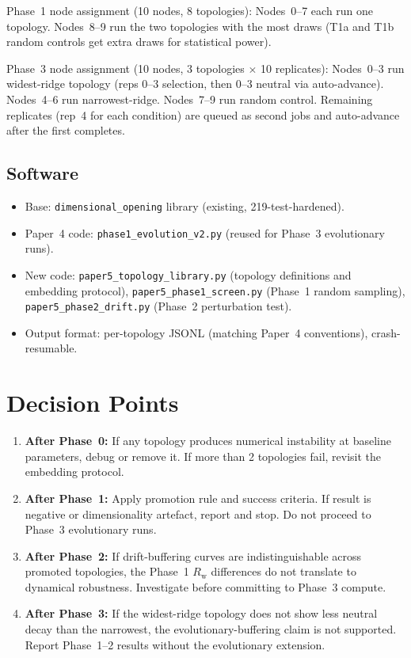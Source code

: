 \documentclass[aps,prl,twocolumn,superscriptaddress,floatfix]{revtex4-2}
\newcommand{\Rw}{R_{\mathrm{w}}}
\begin{document}
Phase~1 node assignment (10 nodes, 8 topologies):
Nodes~0--7 each run one topology.  Nodes~8--9 run the two
topologies with the most draws (T1a and T1b random controls
get extra draws for statistical power).

Phase~3 node assignment (10 nodes, 3 topologies $\times$
10 replicates):  Nodes~0--3 run widest-ridge topology
(reps 0--3 selection, then 0--3 neutral via auto-advance).
Nodes~4--6 run narrowest-ridge.  Nodes~7--9 run random
control.  Remaining replicates (rep~4 for each condition)
are queued as second jobs and auto-advance after the first
completes.

\subsection{Software}

\begin{itemize}
  \item Base: \texttt{dimensional\_opening} library (existing,
    219-test-hardened).
  \item Paper~4 code: \texttt{phase1\_evolution\_v2.py} (reused
    for Phase~3 evolutionary runs).
  \item New code: \texttt{paper5\_topology\_library.py}
    (topology definitions and embedding protocol),
    \texttt{paper5\_phase1\_screen.py} (Phase~1 random sampling),
    \texttt{paper5\_phase2\_drift.py} (Phase~2 perturbation test).
  \item Output format: per-topology JSONL (matching Paper~4
    conventions), crash-resumable.
\end{itemize}

\section{Decision Points}

\begin{enumerate}
  \item \textbf{After Phase~0:}  If any topology produces
    numerical instability at baseline parameters, debug or
    remove it.  If more than 2 topologies fail, revisit the
    embedding protocol.

  \item \textbf{After Phase~1:}  Apply promotion rule and
    success criteria.  If result is negative or dimensionality
    artefact, report and stop.  Do not proceed to Phase~3
    evolutionary runs.

  \item \textbf{After Phase~2:}  If drift-buffering curves are
    indistinguishable across promoted topologies, the Phase~1
    $\Rw$ differences do not translate to dynamical robustness.
    Investigate before committing to Phase~3 compute.

  \item \textbf{After Phase~3:}  If the widest-ridge topology
    does not show less neutral decay than the narrowest, the
    evolutionary-buffering claim is not supported.  Report
    Phase~1--2 results without the evolutionary extension.
\end{enumerate}
\end{document}
